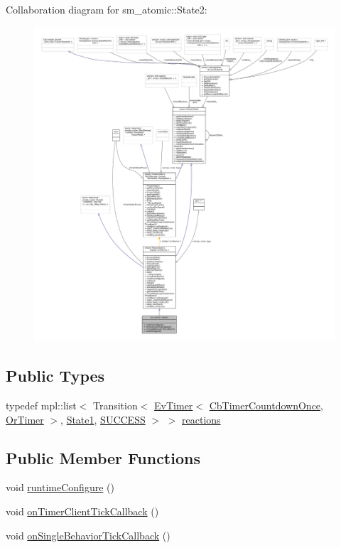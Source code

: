 Collaboration diagram for sm\+\_\+atomic\+:\+:State2\+:
\nopagebreak
\begin{figure}[H]
\begin{center}
\leavevmode
\includegraphics[width=350pt]{structsm__atomic_1_1State2__coll__graph}
\end{center}
\end{figure}
\subsection*{Public Types}
\begin{DoxyCompactItemize}
\item 
typedef mpl\+::list$<$ Transition$<$ \hyperlink{structros__timer__client_1_1EvTimer}{Ev\+Timer}$<$ \hyperlink{classros__timer__client_1_1CbTimerCountdownOnce}{Cb\+Timer\+Countdown\+Once}, \hyperlink{classsm__atomic_1_1OrTimer}{Or\+Timer} $>$, \hyperlink{structsm__atomic_1_1State1}{State1}, \hyperlink{structsmacc_1_1default__transition__tags_1_1SUCCESS}{S\+U\+C\+C\+E\+SS} $>$ $>$ \hyperlink{structsm__atomic_1_1State2_a9436556de6be8ea64fd35707aa4bfec8}{reactions}
\end{DoxyCompactItemize}
\subsection*{Public Member Functions}
\begin{DoxyCompactItemize}
\item 
void \hyperlink{structsm__atomic_1_1State2_afd749890e13d8aa36f1ac6645a5f7f9a}{runtime\+Configure} ()
\item 
void \hyperlink{structsm__atomic_1_1State2_ab265295bfddde63b2dcf5f97bfc44e48}{on\+Timer\+Client\+Tick\+Callback} ()
\item 
void \hyperlink{structsm__atomic_1_1State2_a871fb6c688a61bb4902ea6d44f51025c}{on\+Single\+Behavior\+Tick\+Callback} ()
\end{DoxyCompactItemize}
